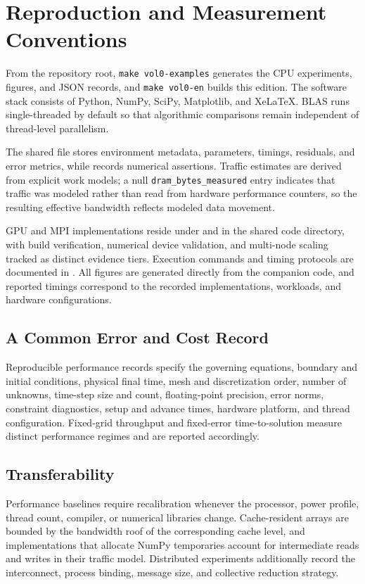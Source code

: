 \chapter{Reproduction and Measurement Conventions}
From the repository root, \texttt{make vol0-examples} generates the CPU experiments, figures, and JSON records, and \texttt{make vol0-en} builds this edition. The software stack consists of Python, NumPy, SciPy, Matplotlib, and XeLaTeX. BLAS runs single-threaded by default so that algorithmic comparisons remain independent of thread-level parallelism.
\par
The shared file  stores environment metadata, parameters, timings, residuals, and error metrics, while  records numerical assertions. Traffic estimates are derived from explicit work models; a null \texttt{dram\_bytes\_measured} entry indicates that traffic was modeled rather than read from hardware performance counters, so the resulting effective bandwidth reflects modeled data movement.
\par
GPU and MPI implementations reside under  and  in the shared code directory, with build verification, numerical device validation, and multi-node scaling tracked as distinct evidence tiers. Execution commands and timing protocols are documented in . All figures are generated directly from the companion code, and reported timings correspond to the recorded implementations, workloads, and hardware configurations.
\section{A Common Error and Cost Record}
Reproducible performance records specify the governing equations, boundary and initial conditions, physical final time, mesh and discretization order, number of unknowns, time-step size and count, floating-point precision, error norms, constraint diagnostics, setup and advance times, hardware platform, and thread configuration. Fixed-grid throughput and fixed-error time-to-solution measure distinct performance regimes and are reported accordingly.
\section{Transferability}
Performance baselines require recalibration whenever the processor, power profile, thread count, compiler, or numerical libraries change. Cache-resident arrays are bounded by the bandwidth roof of the corresponding cache level, and implementations that allocate NumPy temporaries account for intermediate reads and writes in their traffic model. Distributed experiments additionally record the interconnect, process binding, message size, and collective reduction strategy.

